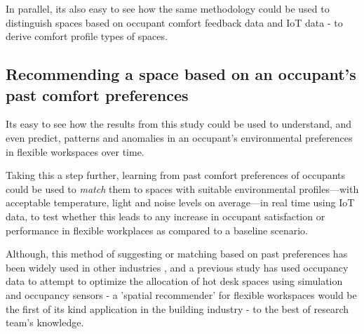 \documentclass[]{interact}
\theoremstyle{plain}%
\theoremstyle{definition}
\theoremstyle{remark}
\begin{document}
In parallel, its also easy to see how the same methodology could be used to distinguish spaces based on occupant comfort feedback data and IoT data - to derive comfort profile types of spaces.



\subsection{Recommending a space based on an occupant's past comfort preferences}

Its easy to see how the results from this study could be used to understand, and even predict, patterns and anomalies in an occupant's environmental preferences in flexible workspaces over time.

Taking this a step further, learning from past comfort preferences of occupants could be used to \emph{match} them to spaces with suitable environmental profiles---with acceptable temperature, light and noise levels on average---in real time using IoT data, to test whether this leads to any increase in occupant satisfaction or performance in flexible workplaces as compared to a baseline scenario. 

Although, this method of suggesting or matching based on past preferences has been widely used in other industries \cite{Recommender, Resnick}, and a previous study has used occupancy data to attempt to optimize the allocation of hot desk spaces using simulation and occupancy sensors \cite{Cooper2017AnData} - a 'spatial recommender' for flexible workspaces would be the first of its kind application in the building industry - to the best of research team's knowledge.   


\end{document}
